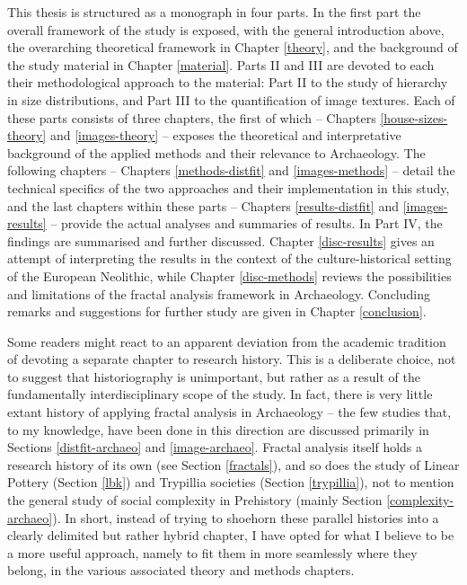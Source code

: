 \documentclass[
  12pt,
]{book}
\begin{document}
This thesis is structured as a monograph in four parts. In the first part the overall framework of the study is exposed, with the general introduction above, the overarching theoretical framework in Chapter \ref{theory}, and the background of the study material in Chapter \ref{material}. Parts II and III are devoted to each their methodological approach to the material: Part II to the study of hierarchy in size distributions, and Part III to the quantification of image textures. Each of these parts consists of three chapters, the first of which -- Chapters \ref{house-sizes-theory} and \ref{images-theory} -- exposes the theoretical and interpretative background of the applied methods and their relevance to Archaeology. The following chapters -- Chapters \ref{methods-distfit} and \ref{images-methods} -- detail the technical specifics of the two approaches and their implementation in this study, and the last chapters within these parts -- Chapters \ref{results-distfit} and \ref{images-results} -- provide the actual analyses and summaries of results. In Part IV, the findings are summarised and further discussed. Chapter \ref{disc-results} gives an attempt of interpreting the results in the context of the culture-historical setting of the European Neolithic, while Chapter \ref{disc-methods} reviews the possibilities and limitations of the fractal analysis framework in Archaeology. Concluding remarks and suggestions for further study are given in Chapter \ref{conclusion}.

Some readers might react to an apparent deviation from the academic tradition of devoting a separate chapter to research history. This is a deliberate choice, not to suggest that historiography is unimportant, but rather as a result of the fundamentally interdisciplinary scope of the study. In fact, there is very little extant history of applying fractal analysis in Archaeology -- the few studies that, to my knowledge, have been done in this direction are discussed primarily in Sections \ref{distfit-archaeo} and \ref{image-archaeo}. Fractal analysis itself holds a research history of its own (see Section \ref{fractals}), and so does the study of Linear Pottery (Section \ref{lbk}) and Trypillia societies (Section \ref{trypillia}), not to mention the general study of social complexity in Prehistory (mainly Section \ref{complexity-archaeo}). In short, instead of trying to shoehorn these parallel histories into a clearly delimited but rather hybrid chapter, I have opted for what I believe to be a more useful approach, namely to fit them in more seamlessly where they belong, in the various associated theory and methods chapters.
\end{document}

